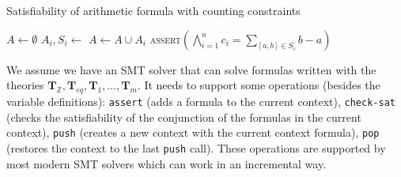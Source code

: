 \documentclass[]{article}
\begin{document}
\begin{algorithm}[h]
\caption{Satisfiability of arithmetic formula with counting constraints}\label{arith}
\begin{algorithmic}[1]
\State {}
    \State {}
    \State $A \gets \emptyset$
        \State $A_i, S_i \gets $ 
        \State $A \gets A \cup A_i$
            \State {}
            \State {}
        \EndIf
    \EndFor
    \State {}
    \State \textsc{assert}$\left(\bigwedge\limits_{i=1}^n c_i = \sum\limits_{[a, b] \in S_i} b - a\right)$
        \State {}
        \State {}
    \EndIf
    \State {}
    \State {}
\EndWhile
\State {}
\end{algorithmic}
\label{arith}
\end{algorithm}

We assume we have an SMT solver that can solve formulas written with the
theories
$\mathbf{T}_\mathbb{Z}, \mathbf{T}_{eq}, \mathbf{T}_1, \ldots, \mathbf{T}_m$.
It needs to support some operations (besides the variable definitions):
\texttt{assert} (adds a formula to the current context),
\texttt{check-sat} (checks the satisfiability of the conjunction of the
formulas in the current context), \texttt{push} (creates a new context
with the current context formula), \texttt{pop} (restores the context to
the last \texttt{push} call). These operations are supported by most
modern SMT solvers which can work in an incremental way.
\end{document}
